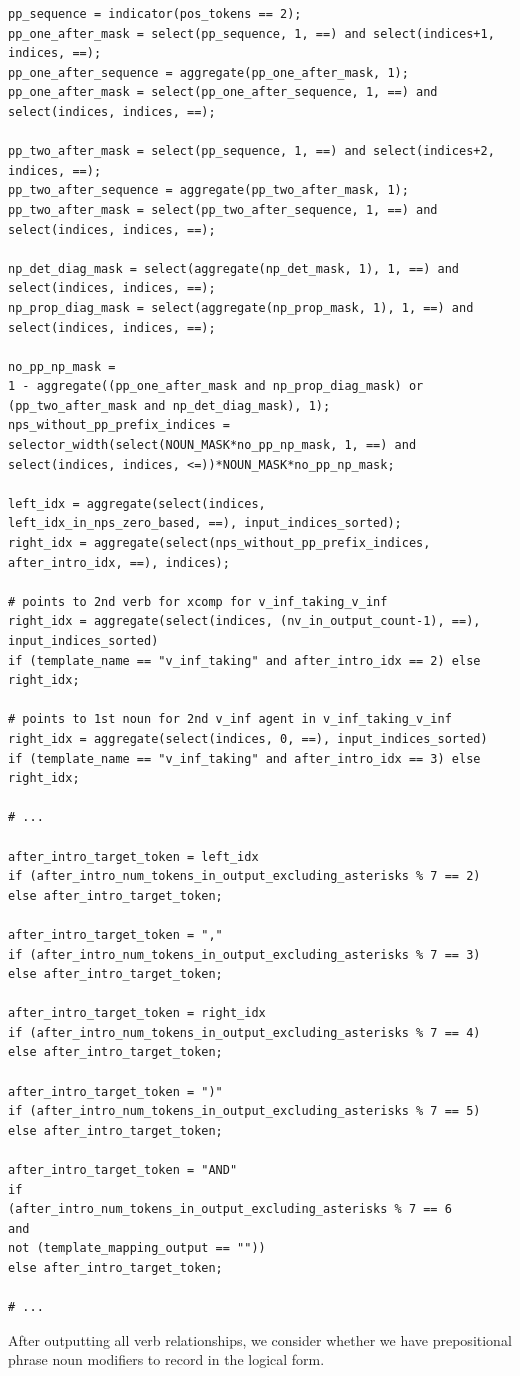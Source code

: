\documentclass[11pt]{article}
\begin{document}
\begin{tiny}
\begin{verbatim}
pp_sequence = indicator(pos_tokens == 2);
pp_one_after_mask = select(pp_sequence, 1, ==) and select(indices+1, indices, ==);
pp_one_after_sequence = aggregate(pp_one_after_mask, 1);
pp_one_after_mask = select(pp_one_after_sequence, 1, ==) and select(indices, indices, ==);

pp_two_after_mask = select(pp_sequence, 1, ==) and select(indices+2, indices, ==);
pp_two_after_sequence = aggregate(pp_two_after_mask, 1);
pp_two_after_mask = select(pp_two_after_sequence, 1, ==) and select(indices, indices, ==);

np_det_diag_mask = select(aggregate(np_det_mask, 1), 1, ==) and select(indices, indices, ==);
np_prop_diag_mask = select(aggregate(np_prop_mask, 1), 1, ==) and select(indices, indices, ==);

no_pp_np_mask = 
1 - aggregate((pp_one_after_mask and np_prop_diag_mask) or 
(pp_two_after_mask and np_det_diag_mask), 1);
nps_without_pp_prefix_indices = 
selector_width(select(NOUN_MASK*no_pp_np_mask, 1, ==) and
select(indices, indices, <=))*NOUN_MASK*no_pp_np_mask;

left_idx = aggregate(select(indices,
left_idx_in_nps_zero_based, ==), input_indices_sorted);
right_idx = aggregate(select(nps_without_pp_prefix_indices, after_intro_idx, ==), indices);

# points to 2nd verb for xcomp for v_inf_taking_v_inf
right_idx = aggregate(select(indices, (nv_in_output_count-1), ==), input_indices_sorted) 
if (template_name == "v_inf_taking" and after_intro_idx == 2) else right_idx;

# points to 1st noun for 2nd v_inf agent in v_inf_taking_v_inf
right_idx = aggregate(select(indices, 0, ==), input_indices_sorted) 
if (template_name == "v_inf_taking" and after_intro_idx == 3) else right_idx;

# ...

after_intro_target_token = left_idx 
if (after_intro_num_tokens_in_output_excluding_asterisks % 7 == 2)
else after_intro_target_token;

after_intro_target_token = "," 
if (after_intro_num_tokens_in_output_excluding_asterisks % 7 == 3)
else after_intro_target_token;

after_intro_target_token = right_idx 
if (after_intro_num_tokens_in_output_excluding_asterisks % 7 == 4)
else after_intro_target_token;

after_intro_target_token = ")" 
if (after_intro_num_tokens_in_output_excluding_asterisks % 7 == 5) 
else after_intro_target_token;

after_intro_target_token = "AND"
if 
(after_intro_num_tokens_in_output_excluding_asterisks % 7 == 6
and
not (template_mapping_output == ""))
else after_intro_target_token;

# ...
\end{verbatim}
\end{tiny}
\clearpage
After outputting all verb relationships, we consider whether we have prepositional phrase noun modifiers to record in the logical form.
\end{document}
